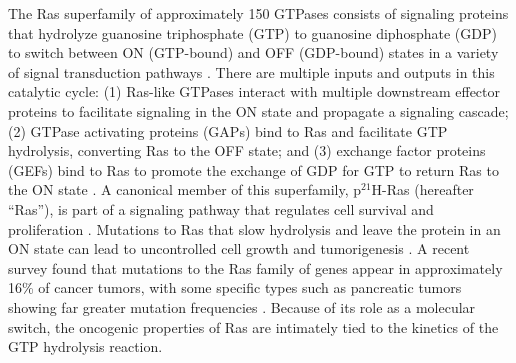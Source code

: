 The Ras superfamily of approximately 150 GTPases consists of signaling proteins that hydrolyze guanosine triphosphate (GTP) to guanosine diphosphate (GDP) to switch between ON (GTP-bound) and OFF (GDP-bound) states in a variety of signal transduction pathways \cite{Bourne1991, Krauss2003}.
There are multiple inputs and outputs in this catalytic cycle: (1) Ras-like GTPases interact with multiple downstream effector proteins to facilitate signaling in the ON state and propagate a signaling cascade; (2) GTPase activating proteins (GAPs) bind to Ras and facilitate GTP hydrolysis, converting Ras to the OFF state; and (3) exchange factor proteins (GEFs) bind to Ras to promote the exchange of GDP for GTP to return Ras to the ON state \cite{Krauss2003, Cherfils2013, Khrenova2015}.
A canonical member of this superfamily, p$^{21}$H-Ras (hereafter ``Ras''), is part of a signaling pathway that regulates cell survival and proliferation \cite{Shields2000, Cox2003, Downward2003, Repasky2004, Prior2012}.
Mutations to Ras that slow hydrolysis and leave the protein in an ON state can lead to uncontrolled cell growth and tumorigenesis \cite{Prior2012}. 
A recent survey found that mutations to the Ras family of genes appear in approximately 16\% of cancer tumors, with some specific types such as pancreatic tumors showing far greater mutation frequencies \cite{Prior2012}. 
Because of its role as a molecular switch, the oncogenic properties of Ras are intimately tied to the kinetics of the GTP hydrolysis reaction.

